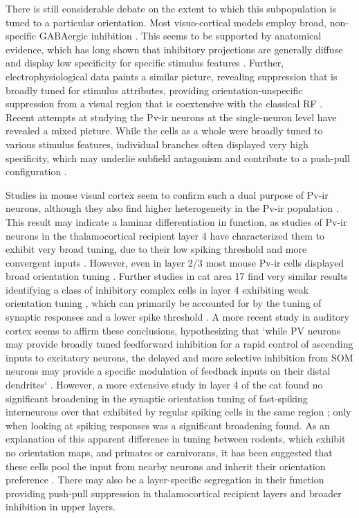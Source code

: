 There is still considerable debate on the extent to which this
subpopulation is tuned to a particular orientation. Most
visuo-cortical models employ broad, non-specific GABAergic inhibition
\citep{Somers1998,Troyer1998}. This seems to be supported by
anatomical evidence, which has long shown that inhibitory projections
are generally diffuse and display low specificity for specific
stimulus features \citep{Albus1994,Kisvarday1997a}. Further,
electrophysiological data paints a similar picture, revealing
suppression that is broadly tuned for stimulus attributes, providing
orientation-unspecific suppression from a visual region that is
coextensive with the classical RF \citep{DeAngelis1992}. Recent
attempts at studying the Pv-ir neurons at the single-neuron level have
revealed a mixed picture. While the cells as a whole were broadly
tuned to various stimulus features, individual branches often
displayed very high specificity, which may underlie subfield
antagonism and contribute to a push-pull configuration
\citep{Kisvarday2002}. 

Studies in mouse visual cortex seem to confirm such a dual purpose of
Pv-ir neurons, although they also find higher heterogeneity in the
Pv-ir population \citep{Runyan2010}. This result may indicate a
laminar differentiation in function, as studies of Pv-ir neurons in the
thalamocortical recipient layer 4 have characterized them to exhibit
very broad tuning, due to their low spiking threshold and more
convergent inputs \citep{Ma2011}. However, even in layer 2/3 most
mouse Pv-ir cells displayed broad orientation tuning
\citep{Hofer2011}. Further studies in cat area 17 find very similar
results identifying a class of inhibitory complex cells in layer 4
exhibiting weak orientation tuning \citep{Hirsch2003}, which can
primarily be accounted for by the tuning of synaptic responses and a
lower spike threshold \citep{Nowak2008}.  A more recent study in
auditory cortex seems to affirm these conclusions, hypothesizing that
`while PV neurons may provide broadly tuned feedforward inhibition for
a rapid control of ascending inputs to excitatory neurons, the delayed
and more selective inhibition from SOM neurons may provide a specific
modulation of feedback inputs on their distal dendrites`
\citep{Li2014}. However, a more extensive study in layer 4 of the cat
found no significant broadening in the synaptic orientation tuning of
fast-spiking interneurons over that exhibited by regular spiking cells
in the same region \citep{Cardin2007}; only when looking at spiking
responses was a significant broadening found. As an explanation of
this apparent difference in tuning between rodents, which
exhibit no orientation maps, and primates or carnivorans, it has been suggested
that these cells pool the input from nearby neurons and inherit their
orientation preference \citep{Isaacson2011}. There may also be
a layer-specific segregation in their function providing
push-pull suppression in thalamocortical recipient layers and broader
inhibition in upper layers.

